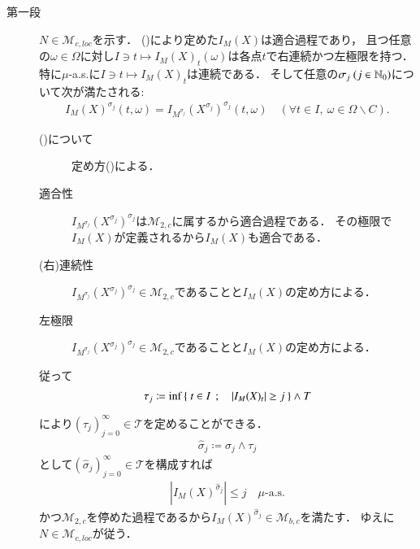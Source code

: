 	\begin{prf}
		\begin{description}
			\item[第一段] $N \in \mathcal{M}_{c,loc}$を示す．
				()により定めた$I_M(X)$は適合過程であり，
				且つ任意の$\omega \in \Omega$に対し$I \ni t \longmapsto I_M(X)_t(\omega)$は各点$t$で右連続かつ左極限を持つ．
				特に$\mu$-a.s.に$I \ni t \longmapsto I_M(X)_t$は連続である．
				そして任意の$\sigma_j\ (j \in \mathbb{N}_0)$について次が満たされる:
				\begin{align}
					I_M(X)^{\sigma_j}(t,\omega) = I_{M^{\sigma_j}}(X^{\sigma_j})^{\sigma_j}(t,\omega)
					\quad (\forall t \in I,\ \omega \in \Omega \backslash C).
					\label{eq:Ito-Integral_on_M_c_loc_localize}
				\end{align}
				\begin{description}
					\item[()について]
						定め方()による．
					\item[適合性]
						$I_{M^{\sigma_j}}(X^{\sigma_j})^{\sigma_j}$は$\mathcal{M}_{2,c}$に属するから適合過程である．
						その極限で$I_M(X)$が定義されるから$I_M(X)$も適合である．
					\item[(右)連続性] $I_{M^{\sigma_j}}(X^{\sigma_j})^{\sigma_j} \in \mathcal{M}_{2,c}$であることと$I_M(X)$の定め方による．
					\item[左極限] $I_{M^{\sigma_j}}(X^{\sigma_j})^{\sigma_j} \in \mathcal{M}_{2,c}$であることと$I_M(X)$の定め方による．
				\end{description}
				従って
				\begin{align}
					\tau_j \coloneqq \operatorname*{inf}_{} \left\{\ t \in I\ \, ; \quad |I_M(X)_t| \geq j\ \right\} \wedge T
				\end{align}
				により$(\tau_j)_{j=0}^{\infty} \in \mathcal{T}$を定めることができる．
				\begin{align}
					\hat{\sigma}_j \coloneqq \sigma_j \wedge \tau_j
				\end{align}
				として$\left( \hat{\sigma}_j \right)_{j=0}^{\infty} \in \mathcal{T}$を構成すれば
				\begin{align}
					\left| I_M(X)^{\hat{\sigma}_j} \right| \leq j \quad \mbox{$\mu$-a.s.}
				\end{align}
				かつ$\mathcal{M}_{2,c}$を停めた過程であるから$I_M(X)^{\hat{\sigma}_j} \in \mathcal{M}_{b,c}$を満たす．
				ゆえに$N \in \mathcal{M}_{c,loc}$が従う．
			

\end{description}
\end{prf}

